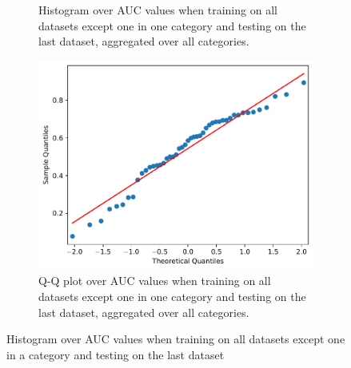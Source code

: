 {{{{{{{{{{{{\begin{figure}
    \begin{subfigure}[b]{0.48\textwidth}
        \caption{Histogram over AUC values when training on all datasets except one in one category and testing on the last dataset, aggregated over all categories.}
        \label{fig:strat_all_all_hist}
    \end{subfigure}
    \begin{subfigure}[b]{0.48\textwidth}
        \includegraphics[width=\textwidth]{figs/auc_qqplot_cv.pdf}
        \caption{Q-Q plot over AUC values when training on all datasets except one in one category and testing on the last dataset, aggregated over all categories.}
        \label{fig:strat_all_all_qq}
    \end{subfigure}
    \caption{Histogram over AUC values when training on all datasets except one in a category and testing on the last dataset}
    \label{fig:strat_all_all}
\end{figure}


}}}}}}}}}}}}
